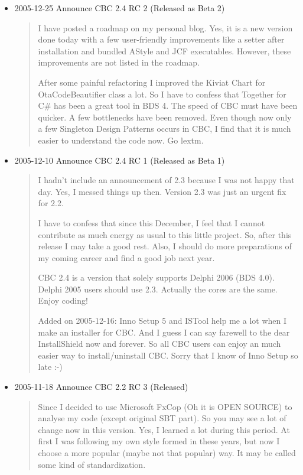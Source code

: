 \begin{itemize}
  \item 2005-12-25 Announce CBC 2.4 RC 2 (Released as Beta 2)

  \begin{quotation}
    I have posted a roadmap on my personal blog. Yes, it is a new
    version done today with a few user-friendly improvements like a
    setter after installation and bundled AStyle and JCF executables.
    However, these improvements are not listed in the roadmap.

    After some painful refactoring I improved the Kiviat Chart for
    OtaCodeBeautifier class a lot. So I have to confess that Together
    for C\# has been a great tool in BDS 4. The speed of CBC must have
    been quicker. A few bottlenecks have been removed. Even though now
    only a few Singleton Design Patterns occurs in CBC, I find that it
    is much easier to understand the code now. Go lextm.
  \end{quotation}

  \item 2005-12-10 Announce CBC 2.4 RC 1 (Released as Beta 1)

  \begin{quotation}
    I hadn't include an announcement of 2.3 because I was not happy
    that day. Yes, I messed things up then. Version 2.3 was just an
    urgent fix for 2.2.

    I have to confess that since this December, I feel that I cannot
    contribute as much energy as usual to this little project. So,
    after this release I may take a good rest. Also, I should do more
    preparations of my coming career and find a good job next year.

    CBC 2.4 is a version that solely supports Delphi 2006 (BDS 4.0).
    Delphi 2005 users should use 2.3. Actually the cores are the same.
    Enjoy coding!

    Added on 2005-12-16: Inno Setup 5 and ISTool help me a lot when I
    make an installer for CBC. And I guess I can say farewell to the
    dear InstallShield now and forever. So all CBC users can enjoy an
    much easier way to install/uninstall CBC. Sorry that I know of Inno
    Setup so late :-)
  \end{quotation}

  \item 2005-11-18 Announce CBC 2.2 RC 3 (Released)

  \begin{quotation}
    Since I decided to use Microsoft FxCop (Oh it is OPEN SOURCE) to
    analyse my code (except original SBT part). So you may see a lot of
    change now in this version. Yes, I learned a lot during this
    period. At first I was following my own style formed in these
    years, but now I choose a more popular (maybe not that popular)
    way. It may be called some kind of standardization.


\end{quotation}
\end{itemize}
